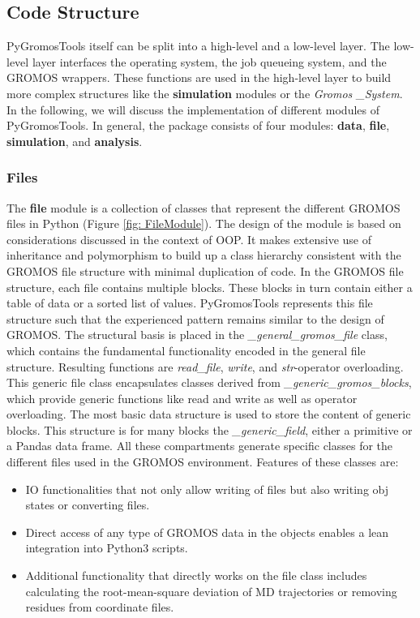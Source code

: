 \subsection{Code Structure}
PyGromosTools itself can be split into a high-level and a low-level layer. 
The low-level layer interfaces the operating system, the job queueing system, and the GROMOS wrappers. These functions are used in the high-level layer to build more complex structures like the \textbf{simulation} modules or the \textit{Gromos
\_System}. 
%
In the following, we will discuss the implementation of different modules of PyGromosTools. In general, the package consists of four modules: \textbf{data}, \textbf{file}, \textbf{simulation}, and \textbf{analysis}.  


\subsubsection{Files}
The \textbf{file} module is a collection of classes that represent the different GROMOS files in Python (Figure \ref{fig: FileModule}). The design of the module is based on considerations discussed in the context of OOP. It makes extensive use of inheritance and polymorphism to build up a class hierarchy consistent with the GROMOS file structure with minimal duplication of code.
In the GROMOS file structure, each file contains multiple blocks. These blocks in turn contain either a table of data or a sorted list of values. PyGromosTools represents this file structure such that the experienced pattern remains similar to the design of GROMOS. The structural basis is placed in the \textit{\_general\_gromos\_file} class, which contains the fundamental functionality encoded in the general file structure. Resulting functions are \textit{read\_file}, \textit{write}, and \textit{str}-operator overloading.
This generic file class encapsulates classes derived from \textit{\_generic\_gromos\_blocks}, which provide generic functions like read and write as well as operator overloading. 
The most basic data structure is used to store the content of generic blocks. This structure is for many blocks the \textit{\_generic\_field}, either a primitive or a Pandas data frame.
%
All these compartments generate specific classes for the different files used in the GROMOS environment. Features of these classes are: 
\begin{itemize}
    \item IO functionalities that not only allow writing of files but also writing obj states or converting files.
    \item Direct access of any type of GROMOS data in the objects enables a lean integration into Python3 scripts.
    \item Additional functionality that directly works on the file class includes calculating the root-mean-square deviation of MD trajectories or removing residues from coordinate files.
\end{itemize}

